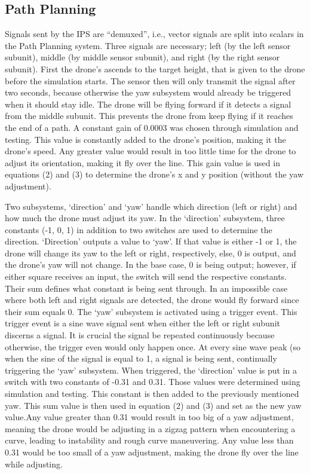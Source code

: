 \documentclass[a4paper, 10pt, conference]{IEEEtran}
\begin{document}
\subsection{Path Planning}
Signals sent by the IPS are “demuxed”, i.e., vector signals are split into scalars \cite{2} in the Path Planning system. Three signals are necessary; left (by the left sensor subunit), middle (by middle sensor subunit), and right (by the right sensor subunit).
First the drone's ascends to the target height, that is given to the drone before the simulation starts. The sensor then will only transmit the signal after two seconds, because otherwise the yaw subsystem would already be triggered when it should stay idle.
The drone will be flying forward if it detects a signal from the middle subunit. This prevents the drone from keep flying if it reaches the end of a path. A constant gain of 0.0003 was chosen through simulation and testing. This value is constantly added to the drone's position, making it the drone's speed. Any greater value would result in too little time for the drone to adjust its orientation, making it fly over the line. This gain value is used in equations (2) and (3) to determine the drone's x and y position (without the yaw adjustment).\\\par
Two subsystems, ‘direction’ and ‘yaw’ handle which direction (left or right) and how much the drone must adjust its yaw.
In the ‘direction’ subsystem, three constants (-1, 0, 1) in addition to two switches are used to determine the direction. ‘Direction’ outputs a value to ‘yaw’. If that value is either -1 or 1, the drone will change its yaw to the left or right, respectively, else, 0 is output, and the drone’s yaw will not change. In the base case, 0 is being output; however, if either square receives an input, the switch will send the respective constants. Their sum defines what constant is being sent through. In an impossible case where both left and right signals are detected, the drone would fly forward since their sum equals 0.
The ‘yaw’ subsystem is activated using a trigger event. This trigger event is a sine wave signal sent when either the left or right subunit discerns a signal. It is crucial the signal be repeated continuously because otherwise, the trigger even would only happen once. At every sine wave peak (so when the sine of the signal is equal to 1, a signal is being sent, continually triggering the ‘yaw’ subsystem.
When triggered, the ‘direction’ value is put in a switch with two constants of -0.31 and 0.31. Those values were determined using simulation and testing. This constant is then added to the previously mentioned yaw. This sum value is then used in equation (2) and (3) and set as the new yaw value.Any value greater than 0.31 would result in too big of a yaw adjustment, meaning the drone would be adjusting in a zigzag pattern when encountering a curve, leading to instability and rough curve maneuvering. Any value less than 0.31 would be too small of a yaw adjustment, making the drone fly over the line while adjusting.
\end{document}

